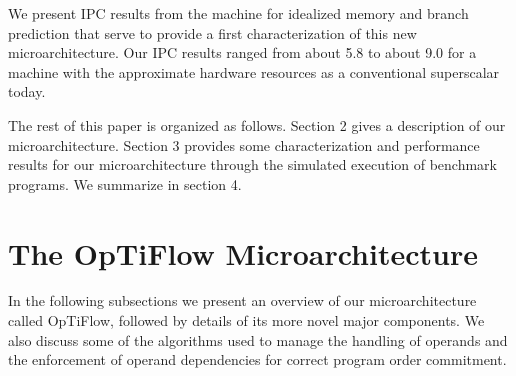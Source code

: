 \documentclass[10pt,dvips]{article}
\begin{document}
We present IPC results from the machine for idealized memory and branch
prediction that serve to provide a first characterization of
this new microarchitecture.  
Our IPC results ranged from about 5.8 to about 9.0 for
a machine with the approximate hardware resources as a
conventional superscalar today.  

The rest of this paper is organized as follows.
Section 2 gives a description of our microarchitecture.
Section 3 provides some characterization and performance 
results for our microarchitecture through the simulated
execution of benchmark programs.
We summarize in section 4.
%
\section{The OpTiFlow Microarchitecture}
%
In the following subsections we present an
overview of our microarchitecture called OpTiFlow, followed by details
of its more novel major components.
We also discuss some of the algorithms used to manage
the handling of operands and the enforcement of
operand dependencies for correct program order commitment.
%
\end{document}
